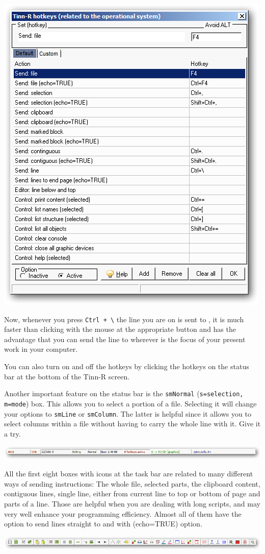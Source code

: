 \includegraphics[scale=0.50]{./res/hotkeys_default.png}

Now, whenever you press \texttt{Ctrl + \textbackslash{}} the line you are on is sent to \RR{},
it is much faster than clicking with the mouse at the appropriate button and has the advantage
that you can send the line to \RR{} wherever is the focus of your present work in your computer.

You can also turn on and off the hotkeys by clicking the hotkeys on the status bar at the bottom of the Tinn-R screen.

Another important feature on the status bar is the \texttt{smNormal} (\texttt{s=selection, m=mode}) box.
This allows you to select a portion of a file.
Selecting it will change your options to \texttt{smLine} or \texttt{smColumn}.
The latter is helpful since it allows you to select columns within a file without having to carry the whole line with it.
Give it a try.

\includegraphics[scale=0.50]{./res/secrets_statusbar.png}

All the first eight boxes with icons at the \RR{} task bar are related to many different ways of sending instructions:
The whole file, selected parts, the clipboard content, contiguous lines, single line, either from current line to top
or bottom of page and parts of a line. Those are helpful when you are dealing with long scripts,
and may very well enhance your programming efficiency.
Almost all of them have the option to send lines straight to \RR{} and with (echo=TRUE) option.

\includegraphics[scale=0.50]{./res/secrets_rtoolbar.png}
